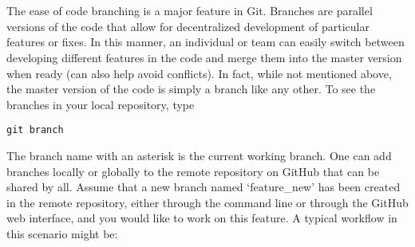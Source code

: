 \documentclass[letter,10pt]{article}
\newcommand*{\TitleFont}{%
      \usefont{\encodingdefault}{\rmdefault}{b}{n}%
      \fontsize{10}{20}%
      \selectfont}
\begin{document}
\section*{\TitleFont{Branching in Git}}

The ease of code branching is a major feature in Git. Branches are parallel versions of the code that allow for decentralized development of particular features or fixes. In this manner, an individual or team can easily switch between developing different features in the code and merge them into the master version when ready (can also help avoid conflicts). In fact, while not mentioned above, the master version of the code is simply a branch like any other. To see the branches in your local repository, type
\begin{verbatim}
git branch
\end{verbatim}
The branch name with an asterisk is the current working branch. One can add branches locally or globally to the remote repository on GitHub that can be shared by all. Assume that a new branch named `feature\_new' has been created in the remote repository, either through the command line or through the GitHub web interface, and you would like to work on this feature. A typical workflow in this scenario might be:
\end{document}
